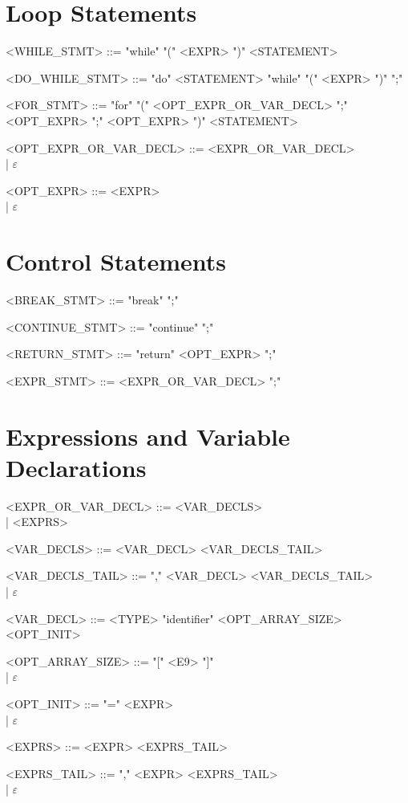 \section{Loop Statements}
\begin{grammar}
      <WHILE\_STMT> ::= "while" "(" <EXPR> ")" <STATEMENT>

      <DO\_WHILE\_STMT> ::= "do" <STATEMENT> "while" "(" <EXPR> ")" ";"

      <FOR\_STMT> ::= "for" "(" <OPT\_EXPR\_OR\_VAR\_DECL> ";" <OPT\_EXPR> ";" <OPT\_EXPR> ")" <STATEMENT>

      <OPT\_EXPR\_OR\_VAR\_DECL> ::= <EXPR\_OR\_VAR\_DECL> \\
      | $\varepsilon$

      <OPT\_EXPR> ::= <EXPR> \\
      | $\varepsilon$
\end{grammar}

\section{Control Statements}
\begin{grammar}
      <BREAK\_STMT> ::= "break" ";"

      <CONTINUE\_STMT> ::= "continue" ";"

      <RETURN\_STMT> ::= "return" <OPT\_EXPR> ";"

      <EXPR\_STMT> ::= <EXPR\_OR\_VAR\_DECL> ";"
\end{grammar}

\section{Expressions and Variable Declarations}
\begin{grammar}
      <EXPR\_OR\_VAR\_DECL> ::= <VAR\_DECLS> \\
      | <EXPRS>

      <VAR\_DECLS> ::= <VAR\_DECL> <VAR\_DECLS\_TAIL>

      <VAR\_DECLS\_TAIL> ::= "," <VAR\_DECL> <VAR\_DECLS\_TAIL> \\
      | $\varepsilon$

      <VAR\_DECL> ::= <TYPE> "identifier" <OPT\_ARRAY\_SIZE> <OPT\_INIT>

      <OPT\_ARRAY\_SIZE> ::= "[" <E9> "]" \\
      | $\varepsilon$

      <OPT\_INIT> ::= "=" <EXPR> \\
      | $\varepsilon$

      <EXPRS> ::= <EXPR> <EXPRS\_TAIL>

      <EXPRS\_TAIL> ::= "," <EXPR> <EXPRS\_TAIL> \\
      | $\varepsilon$
\end{grammar}

